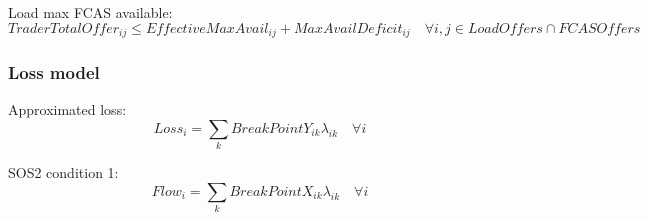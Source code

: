 \documentclass{article}
\begin{document}
%
%
%
%
%
%

Load max FCAS available:
\begin{equation}
TraderTotalOffer_{ij} \leq EffectiveMaxAvail_{ij} + MaxAvailDeficit_{ij} \quad \forall i,j \in LoadOffers \cap FCASOffers
\end{equation}

\subsubsection{Loss model}

Approximated loss:
\begin{equation}
	Loss_{i} = \sum\limits_{k} BreakPointY_{ik} \lambda_{ik} \quad \forall i
\end{equation}


SOS2 condition 1:
\begin{equation}
	Flow_{i} = \sum\limits_{k} BreakPointX_{ik} \lambda_{ik} \quad \forall i
\end{equation}
\end{document}
